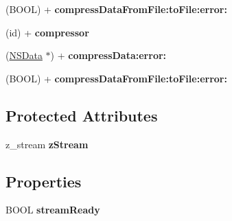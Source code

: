 \begin{DoxyCompactItemize}
\item 
\hypertarget{interface_a_s_i_data_compressor_a023b8247b70bb0ccd7b6a47f5fe7fe67}{
(\-B\-O\-O\-L) + {\bfseries compress\-Data\-From\-File\-:to\-File\-:error\-:}}
\label{interface_a_s_i_data_compressor_a023b8247b70bb0ccd7b6a47f5fe7fe67}

\item 
\hypertarget{interface_a_s_i_data_compressor_acafd876efc9a4f67cb36a944962aaaea}{
(id) + {\bfseries compressor}}
\label{interface_a_s_i_data_compressor_acafd876efc9a4f67cb36a944962aaaea}

\item 
\hypertarget{interface_a_s_i_data_compressor_ad261f31ce584a496f08cf508221b1517}{
(\hyperlink{class_n_s_data}{\-N\-S\-Data} $\ast$) + {\bfseries compress\-Data\-:error\-:}}
\label{interface_a_s_i_data_compressor_ad261f31ce584a496f08cf508221b1517}

\item 
\hypertarget{interface_a_s_i_data_compressor_a023b8247b70bb0ccd7b6a47f5fe7fe67}{
(\-B\-O\-O\-L) + {\bfseries compress\-Data\-From\-File\-:to\-File\-:error\-:}}
\label{interface_a_s_i_data_compressor_a023b8247b70bb0ccd7b6a47f5fe7fe67}

\end{DoxyCompactItemize}
\subsection*{\-Protected \-Attributes}
\begin{DoxyCompactItemize}
\item 
\hypertarget{interface_a_s_i_data_compressor_a67903b0209b6ce054a5091e392d50cce}{
z\-\_\-stream {\bfseries z\-Stream}}
\label{interface_a_s_i_data_compressor_a67903b0209b6ce054a5091e392d50cce}

\end{DoxyCompactItemize}
\subsection*{\-Properties}
\begin{DoxyCompactItemize}
\item 
\hypertarget{interface_a_s_i_data_compressor_a3d213ecd26223b529c53c3b6767e6613}{
\-B\-O\-O\-L {\bfseries stream\-Ready}}
\label{interface_a_s_i_data_compressor_a3d213ecd26223b529c53c3b6767e6613}

\end{DoxyCompactItemize}


